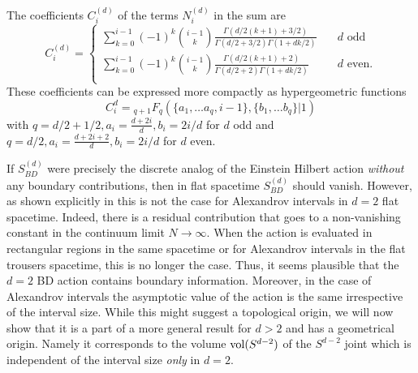 \documentclass[12pt]{article}
\begin{document}
The coefficients $C_i^{ (d)}$ of the terms $N_i^{ (d)}$ in the sum are
\begin{equation}
\label{cid}
 C_i^{ (d)}= 
\begin{cases} 
\displaystyle\sum_{k=0}^{i-1} (-1)^k\binom{i-1}{k} \frac{\Gamma\left (d/2 (k+1)+3/2\right)}{\Gamma\left (d/2+3/2\right) \Gamma\left (1+dk/2\right)}  \quad  &d\mathrm{ \, \, odd}\\ 
\displaystyle\sum_{k=0}^{i-1} (-1)^k\binom{i-1}{k} \frac{\Gamma\left (d/2 (k+1)+2\right)}{\Gamma\left (d/2+2\right) \Gamma\left (1+dk/2\right)}  &d \mathrm{ \, \,  even.}\\ 
\end{cases} 
\end{equation} 
These coefficients can be expressed more compactly as hypergeometric functions 
\begin{equation}
C_i^d={}_{q+1}F_{q} (\{ a_1, \ldots a_q, i-1\}, \{b_1, \ldots b_q \} |1)
\label{chyp} 
\end{equation} 
with $q=d/2+1/2, a_i=\frac{d+2i}{d}, b_i=2i/d$ for $d$ odd and $q=d/2, a_i=\frac{d+2i+2}{d}, b_i=2i/d$  for $d$ even.  


If $S_{BD}^{ (d)}$ were precisely the discrete analog of the Einstein Hilbert action {\it without} any boundary contributions, then in flat spacetime  $S_{BD}^{ (d)}$ should  vanish. However, as shown explicitly in \cite{bbdtwo} this is not the case for Alexandrov intervals in $d=2$  flat spacetime. Indeed, there is a residual contribution that goes to a non-vanishing constant in the continuum limit $N\rightarrow \infty$.  When the action is evaluated in rectangular regions in the same spacetime or for Alexandrov intervals in  the flat trousers spacetime, this is no longer the case. Thus, it seems plausible that the $d=2$ BD action contains boundary information. Moreover, in the case of Alexandrov intervals the asymptotic value of the action is the same  irrespective of the interval size. While this might suggest a  topological origin, we will now show that it is a part of a more general  result for $d>2$ and  has a geometrical origin. Namely it corresponds to the volume  $\mathrm{vol} (S^{d-2})$ of the $S^{d-2}$ joint which is independent of the interval size {\it only} in $d=2$.   
\end{document}
